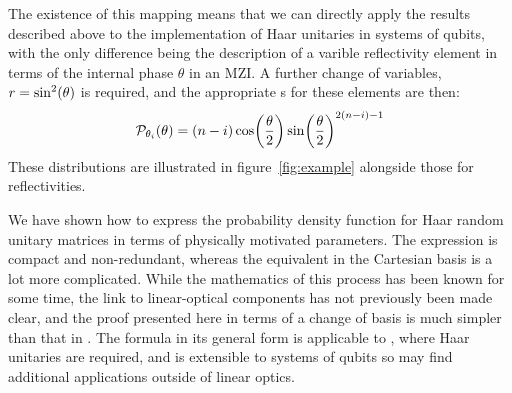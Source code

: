 The existence of this mapping means that we can directly apply the results
described above to the implementation of Haar unitaries in systems of qubits,
with the only difference being the description of a varible reflectivity element
in terms of the internal phase \(\theta\) in an MZI. A further change of
variables, \(r = \sin^{2} \!\left(\theta\right) \) is required, and the appropriate
\pdf{}s for these elements are then:
\begin{equation}
  \mathcal{P}_{\theta_{i}} \!\left( \theta \right) = \left( n-i \right) \cos \!\left(
  \frac{\theta}{2} \right) \sin \!\left( \frac{\theta}{2} \right)^{2 \left(n-i\right) -1}
\end{equation}
These distributions are illustrated in figure~\ref{fig:example} alongside those
for reflectivities.

We have shown how to express the probability density function for Haar random
unitary matrices in terms of physically motivated parameters. The expression is
compact and non-redundant, whereas the equivalent in the Cartesian basis is a
lot more complicated. While the mathematics of this process has been known
for some time, the link to linear-optical components has not previously been
made clear, and the proof presented here in terms of a change of basis is much
simpler than that in \cite{spengler2010}. The formula in its general form
is applicable to \bosonsampling{}, where Haar unitaries are required, and is
extensible to systems of qubits so may find additional applications outside of
linear optics.

